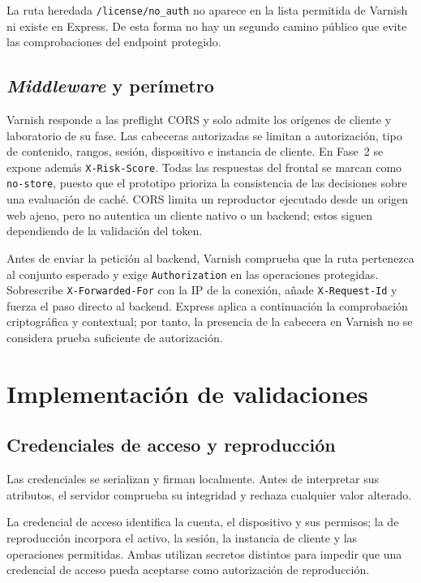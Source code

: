 La ruta heredada \nolinkurl{/license/no_auth} no aparece en la lista permitida de Varnish ni existe en Express. De esta forma no hay un segundo camino público que evite las comprobaciones del endpoint protegido.

\subsection{\textit{Middleware} y perímetro}

Varnish responde a las preflight CORS y solo admite los orígenes de cliente y laboratorio de su fase. Las cabeceras autorizadas se limitan a autorización, tipo de contenido, rangos, sesión, dispositivo e instancia de cliente. En Fase~2 se expone además \nolinkurl{X-Risk-Score}. Todas las respuestas del frontal se marcan como \nolinkurl{no-store}, puesto que el prototipo prioriza la consistencia de las decisiones sobre una evaluación de caché. CORS limita un reproductor ejecutado desde un origen web ajeno, pero no autentica un cliente nativo o un backend; estos siguen dependiendo de la validación del token.

Antes de enviar la petición al backend, Varnish comprueba que la ruta pertenezca al conjunto esperado y exige \nolinkurl{Authorization} en las operaciones protegidas. Sobrescribe \nolinkurl{X-Forwarded-For} con la IP de la conexión, añade \nolinkurl{X-Request-Id} y fuerza el paso directo al backend. Express aplica a continuación la comprobación criptográfica y contextual; por tanto, la presencia de la cabecera en Varnish no se considera prueba suficiente de autorización.

\section{Implementación de validaciones}

\subsection{Credenciales de acceso y reproducción}

Las credenciales se serializan y firman localmente. Antes de interpretar sus atributos, el servidor comprueba su integridad y rechaza cualquier valor alterado.

La credencial de acceso identifica la cuenta, el dispositivo y sus permisos; la de reproducción incorpora el activo, la sesión, la instancia de cliente y las operaciones permitidas. Ambas utilizan secretos distintos para impedir que una credencial de acceso pueda aceptarse como autorización de reproducción.

